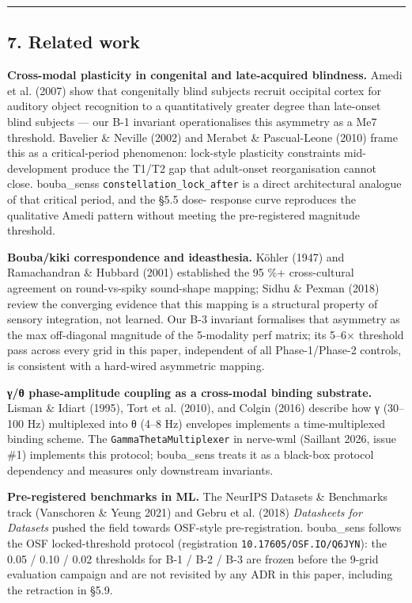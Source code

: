 \documentclass[
]{article}
\begin{document}
\begin{center}\rule{0.5\linewidth}{0.5pt}\end{center}

\subsection{7. Related work}\label{7-related-work}

\textbf{Cross-modal plasticity in congenital and late-acquired
blindness.} Amedi et al. (2007) show that congenitally blind subjects
recruit occipital cortex for auditory object recognition to a
quantitatively greater degree than late-onset blind subjects --- our B-1
invariant operationalises this asymmetry as a Me7 threshold. Bavelier \&
Neville (2002) and Merabet \& Pascual-Leone (2010) frame this as a
critical-period phenomenon: lock-style plasticity constraints mid-
development produce the T1/T2 gap that adult-onset reorganisation cannot
close. bouba\_sens\textquotesingle s \texttt{constellation\_lock\_after}
is a direct architectural analogue of that critical period, and the §5.5
dose- response curve reproduces the qualitative Amedi pattern without
meeting the pre-registered magnitude threshold.

\textbf{Bouba/kiki correspondence and ideasthesia.} Köhler (1947) and
Ramachandran \& Hubbard (2001) established the 95 \%+ cross-cultural
agreement on round-vs-spiky sound-shape mapping; Sidhu \& Pexman (2018)
review the converging evidence that this mapping is a structural
property of sensory integration, not learned. Our B-3 invariant
formalises that asymmetry as the max off-diagonal magnitude of the
5-modality perf matrix; its 5--6× threshold pass across every grid in
this paper, independent of all Phase-1/Phase-2 controls, is consistent
with a hard-wired asymmetric mapping.

\textbf{γ/θ phase-amplitude coupling as a cross-modal binding
substrate.} Lisman \& Idiart (1995), Tort et al. (2010), and Colgin
(2016) describe how γ (30--100 Hz) multiplexed into θ (4--8 Hz)
envelopes implements a time-multiplexed binding scheme. The
\texttt{GammaThetaMultiplexer} in nerve-wml (Saillant 2026, issue \#1)
implements this protocol; bouba\_sens treats it as a black-box protocol
dependency and measures only downstream invariants.

\textbf{Pre-registered benchmarks in ML.} The NeurIPS Datasets \&
Benchmarks track (Vanschoren \& Yeung 2021) and Gebru et al. (2018)
\emph{Datasheets for Datasets} pushed the field towards OSF-style
pre-registration. bouba\_sens follows the OSF locked-threshold protocol
(registration \texttt{10.17605/OSF.IO/Q6JYN}): the 0.05 / 0.10 / 0.02
thresholds for B-1 / B-2 / B-3 are frozen before the 9-grid evaluation
campaign and are not revisited by any ADR in this paper, including the
retraction in §5.9.
\end{document}
